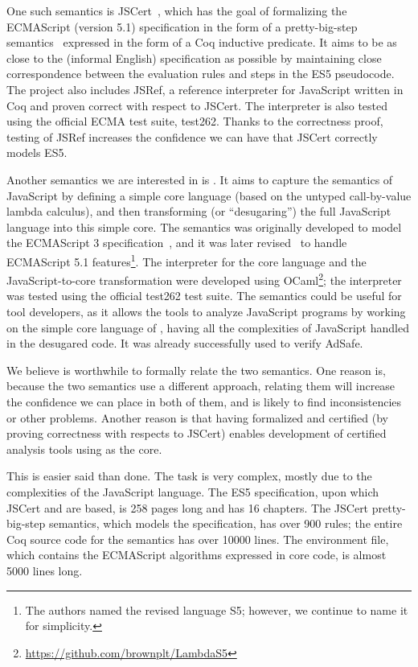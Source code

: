 \documentclass{llncs}
\begin{document}
One such semantics is JSCert~\cite{Bodin-al:POPL14}, which has the
goal of formalizing the ECMAScript (version 5.1) specification in the form of
a pretty-big-step semantics~\cite{Chargueraud:ESOP13} expressed in 
the form of a Coq inductive predicate. It aims to be as close to the
(informal English) specification as possible by maintaining close correspondence
between the evaluation rules and steps in the ES5 pseudocode. The project
also includes JSRef, a reference interpreter for JavaScript written in Coq
and proven correct with respect to JSCert. The interpreter is also tested
using the official ECMA test suite, test262. Thanks to the correctness proof,
testing of JSRef increases the confidence we can have that JSCert
correctly models ES5.

Another semantics we are interested in is \lambdajs. It aims to capture
the semantics of JavaScript by defining a simple core language
(based on the untyped call-by-value lambda calculus), and then
transforming (or ``desugaring'') the full JavaScript language into this
simple core. The \lambdajs{} semantics was originally developed to model the 
ECMAScript 3 specification~\cite{Guha-al:ECOOP10}, and it was later
revised~\cite{Politz-al:DLS12} to handle ECMAScript 5.1
features\footnote{The authors named the revised language S5; however,
we continue to name it \lambdajs{} for simplicity.}.
The interpreter for the core language and the JavaScript-to-core
transformation were developed using 
OCaml\footnote{\url{https://github.com/brownplt/LambdaS5}};
the interpreter was tested using the official test262 test suite.
The \lambdajs{} semantics could be useful for tool developers, as it
allows the tools to analyze JavaScript programs by working
on the simple core language of \lambdajs, having all the complexities
of JavaScript handled in the desugared code. It was already
successfully used to verify AdSafe. %

We believe is worthwhile to formally relate the two semantics. One reason is,
because the two semantics use a different approach, relating
them will increase the confidence we can place in both of them,
and is likely to find inconsistencies or other problems. Another reason is
that having \lambdajs{} formalized and certified (by proving correctness
with respects to JSCert) enables development of certified analysis tools
using \lambdajs{} as the core.

This is easier said than done. The task is very complex, mostly due
to the complexities of the JavaScript language. The ES5 specification,
upon which JSCert and \lambdajs{} are based, is 258 pages long and 
has 16 chapters. The JSCert pretty-big-step semantics, which models
the specification, has over 900 rules; the entire Coq source code
for the semantics has over 10000 lines. The \lambdajs{} environment
file, which contains the ECMAScript algorithms expressed in core
\lambdajs{} code, is almost 5000 lines long.
\end{document}
